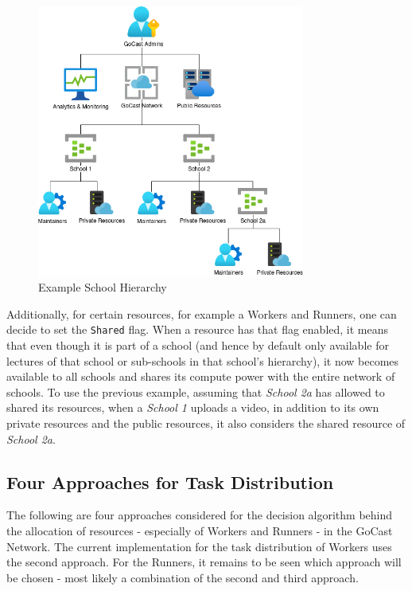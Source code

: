 \begin{figure}[htpb]
    \centering
    \includegraphics[width=250pt]{images/SchoolHierarchy.png}
    \caption[Example School Hierarchy]{Example School Hierarchy}\label{fig:school-hierarchy}
\end{figure}

Additionally, for certain resources, for example a Workers and Runners, one can decide to set the \texttt{Shared} flag. When a resource has that flag enabled, it means that even though it is part of a school (and hence by default only available for lectures of that school or sub-schools in that school's hierarchy), it now becomes available to all schools and shares its compute power with the entire network of schools. To use the previous example, assuming that \textit{School 2a} has allowed to shared its resources, when a \textit{School 1} uploads a video, in addition to its own private resources and the public resources, it also considers the shared resource of \textit{School 2a}.

\subsection{Four Approaches for Task Distribution}

The following are four approaches considered for the decision algorithm behind the allocation of resources - especially of Workers and Runners - in the GoCast Network. The current implementation for the task distribution of Workers uses the second approach. For the Runners, it remains to be seen which approach will be chosen - most likely a combination of the second and third approach. 

